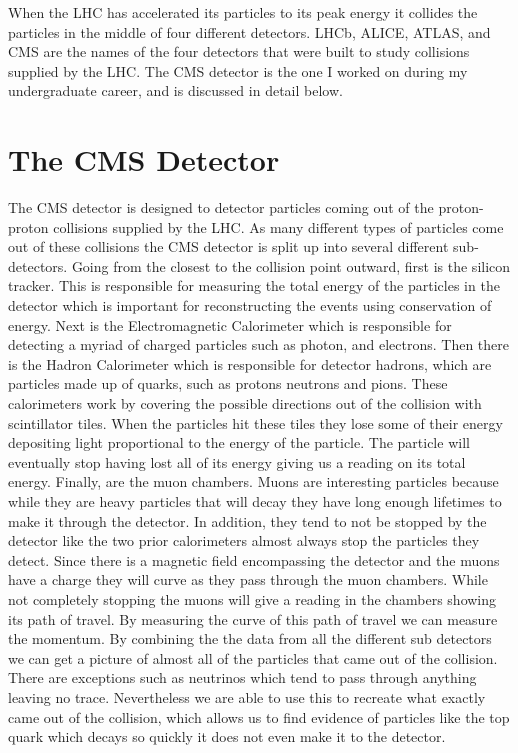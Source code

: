 When the LHC has accelerated its particles to its peak energy it collides the particles in the middle of four different detectors. LHCb, ALICE, ATLAS, and CMS are the names of the four detectors that were built to study collisions supplied by the LHC. The CMS detector is the one I worked on during my undergraduate career, and is discussed in detail below.

\section{The CMS Detector}
The CMS detector is designed to detector particles coming out of the proton-proton collisions supplied by the LHC. As many different types of particles come out of these collisions the CMS detector is split up into several different sub-detectors. Going from the closest to the collision point outward, first is the silicon tracker. This is responsible for measuring the total energy of the particles in the detector which is important for reconstructing the events using conservation of energy. Next is the Electromagnetic Calorimeter which is responsible for detecting a myriad of charged particles such as photon, and electrons. Then there is the Hadron Calorimeter which is responsible for detector hadrons, which are particles made up of quarks, such as protons neutrons and pions. These calorimeters work by covering the possible directions out of the collision with scintillator tiles. When the particles hit these tiles they lose some of their energy depositing light proportional to the energy of the particle. The particle will eventually stop having lost all of its energy giving us a reading on its total energy. Finally, are the muon chambers. Muons are interesting particles because while they are heavy particles that will decay they have long enough lifetimes to make it through the detector. In addition, they tend to not be stopped by the detector like the two prior calorimeters almost always stop the particles they detect. Since there is a magnetic field encompassing the detector and the muons have a charge they will curve as they pass through the muon chambers. While not completely stopping the muons will give a reading in the chambers showing its path of travel. By measuring the curve of this path of travel we can measure the momentum. By combining the the data from all the different sub detectors we can get a picture of almost all of the particles that came out of the collision. There are exceptions such as neutrinos which tend to pass through anything leaving no trace. Nevertheless we are able to use this to recreate what exactly came out of the collision, which allows us to find evidence of particles like the top quark which decays so quickly it does not even make it to the detector.

